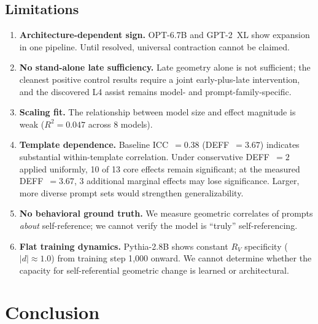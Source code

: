 \documentclass{article}
\newcommand{\RV}{R_V}
\newcommand{\dcohen}{d}
\begin{document}
\subsection{Limitations}

\begin{enumerate}
\item \textbf{Architecture-dependent sign.}
      OPT-6.7B and GPT-2~XL show expansion in one pipeline. Until resolved, universal
      contraction cannot be claimed.
\item \textbf{No stand-alone late sufficiency.}
      Late geometry alone is not sufficient; the cleanest positive control results require a
      joint early-plus-late intervention, and the discovered L4 assist remains
      model- and prompt-family-specific.
\item \textbf{Scaling fit.}
      The relationship between model size and effect magnitude is weak
      ($R^2 = 0.047$ across 8 models).
\item \textbf{Template dependence.}
      Baseline ICC~$= 0.38$ (DEFF~$= 3.67$) indicates substantial within-template
      correlation.
      Under conservative DEFF~$= 2$ applied uniformly, 10 of 13 core effects remain
      significant; at the measured DEFF~$= 3.67$, 3 additional marginal effects
      may lose significance.
      Larger, more diverse prompt sets would strengthen generalizability.
\item \textbf{No behavioral ground truth.}
      We measure geometric correlates of prompts \emph{about} self-reference;
      we cannot verify the model is ``truly'' self-referencing.
\item \textbf{Flat training dynamics.}
      Pythia-2.8B shows constant $\RV$ specificity ($|\dcohen| \approx 1.0$) from training
      step 1{,}000 onward.
      We cannot determine whether the capacity for self-referential geometric change is
      learned or architectural.
\end{enumerate}


\section{Conclusion}
\end{document}
